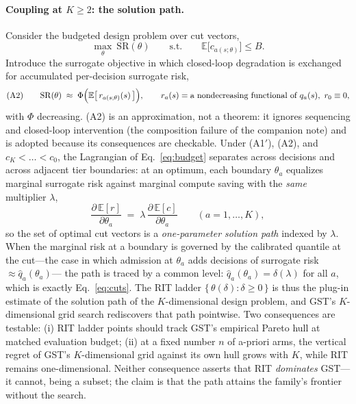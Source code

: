 \documentclass{article}
\begin{document}
\paragraph{Coupling at $K \ge 2$: the solution path.}
Consider the budgeted design problem over cut vectors,
\begin{equation}
\max_{\theta}\ \mathrm{SR}(\theta)
\qquad \text{s.t.} \qquad
\mathbb{E}\bigl[ c_{a(s;\theta)} \bigr] \le B .
\label{eq:budget}
\end{equation}
Introduce the surrogate objective in which closed-loop degradation is
exchanged for accumulated per-decision surrogate risk,
\begin{equation}
\text{(A2)} \qquad
\mathrm{SR}(\theta) \;\approx\; \Phi\Bigl(
\mathbb{E}\bigl[\, r_{a(s;\theta)}(s) \,\bigr] \Bigr),
\qquad
r_a(s) = \text{a nondecreasing functional of } q_a(s),\ r_0 \equiv 0,
\label{eq:A2}
\end{equation}
with $\Phi$ decreasing. (A2) is an approximation, not a theorem: it ignores
sequencing and closed-loop intervention (the composition failure of the
companion note) and is adopted because its consequences are checkable. Under
(A1$'$), (A2), and $c_K < \dots < c_0$, the Lagrangian of
Eq.~\ref{eq:budget} separates across decisions and across adjacent tier
boundaries: at an optimum, each boundary $\theta_a$ equalizes marginal
surrogate risk against marginal compute saving with the \emph{same}
multiplier $\lambda$,
\begin{equation}
\frac{\partial\, \mathbb{E}[r]}{\partial \theta_a}
\;=\;
\lambda\, \frac{\partial\, \mathbb{E}[c]}{\partial \theta_a}
\qquad (a = 1, \dots, K),
\label{eq:kkt}
\end{equation}
so the set of optimal cut vectors is a \emph{one-parameter solution path}
indexed by $\lambda$. When the marginal risk at a boundary is governed by
the calibrated quantile at the cut---the case in which admission at
$\theta_a$ adds decisions of surrogate risk $\approx \hat q_a(\theta_a)$---
the path is traced by a common level: $\hat q_a(\theta_a) = \delta(\lambda)$
for all $a$, which is exactly Eq.~\ref{eq:cuts}. The RIT ladder
$\{\,\theta(\delta) : \delta \ge 0\,\}$ is thus the plug-in estimate of the
solution path of the $K$-dimensional design problem, and GST's
$K$-dimensional grid search rediscovers that path pointwise. Two consequences are testable:
(i) RIT ladder points should track GST's empirical Pareto hull at
matched evaluation budget; (ii) at a fixed number $n$ of a-priori arms, the
vertical regret of GST's $K$-dimensional grid against its own hull grows with
$K$, while RIT remains one-dimensional. Neither consequence asserts
that RIT \emph{dominates} GST---it cannot, being a subset;
the claim is that the path attains the family's frontier without the search.
\end{document}
